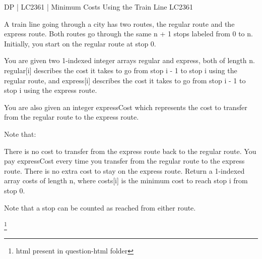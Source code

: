 \begin{problem}{DP | LC2361 | Minimum Costs Using the Train Line
    }
    LC2361

    A train line going through a city has two routes, the regular route and the express route. Both routes go through the same n + 1 stops labeled from 0 to n. Initially, you start on the regular route at stop 0.

You are given two 1-indexed integer arrays regular and express, both of length n. regular[i] describes the cost it takes to go from stop i - 1 to stop i using the regular route, and express[i] describes the cost it takes to go from stop i - 1 to stop i using the express route.

You are also given an integer expressCost which represents the cost to transfer from the regular route to the express route.

Note that:

There is no cost to transfer from the express route back to the regular route.
You pay expressCost every time you transfer from the regular route to the express route.
There is no extra cost to stay on the express route.
Return a 1-indexed array costs of length n, where costs[i] is the minimum cost to reach stop i from stop 0.

Note that a stop can be counted as reached from either route.

\footnote{html present in question-html folder}
\end{problem}

